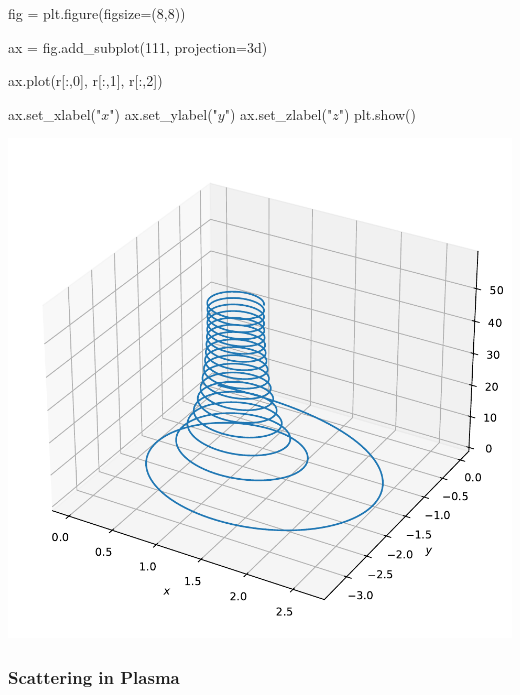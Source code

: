 \documentclass[
  letterpaper,
  DIV=11,
  numbers=noendperiod]{scrreprt}
\newenvironment{Shaded}{\begin{snugshade}}{\end{snugshade}}
\newcommand{\DecValTok}[1]{\textcolor[rgb]{0.68,0.00,0.00}{#1}}
\newcommand{\NormalTok}[1]{\textcolor[rgb]{0.00,0.23,0.31}{#1}}
\newcommand{\OperatorTok}[1]{\textcolor[rgb]{0.37,0.37,0.37}{#1}}
\newcommand{\StringTok}[1]{\textcolor[rgb]{0.13,0.47,0.30}{#1}}
\begin{document}
\begin{tcolorbox}[enhanced jigsaw, toprule=.15mm, colframe=quarto-callout-color-frame, bottomrule=.15mm, leftrule=.75mm, left=2mm, breakable, rightrule=.15mm, arc=.35mm, opacityback=0, colback=white]
\begin{Shaded}
\begin{Highlighting}[]
\NormalTok{fig }\OperatorTok{=}\NormalTok{ plt.figure(figsize}\OperatorTok{=}\NormalTok{(}\DecValTok{8}\NormalTok{,}\DecValTok{8}\NormalTok{))}

\NormalTok{ax }\OperatorTok{=}\NormalTok{ fig.add\_subplot(}\DecValTok{111}\NormalTok{, projection}\OperatorTok{=}\StringTok{\textquotesingle{}3d\textquotesingle{}}\NormalTok{)}

\NormalTok{ax.plot(r[:,}\DecValTok{0}\NormalTok{], r[:,}\DecValTok{1}\NormalTok{], r[:,}\DecValTok{2}\NormalTok{])}

\NormalTok{ax.set\_xlabel(}\StringTok{"$x$"}\NormalTok{)}
\NormalTok{ax.set\_ylabel(}\StringTok{"$y$"}\NormalTok{)}
\NormalTok{ax.set\_zlabel(}\StringTok{"$z$"}\NormalTok{)}
\NormalTok{plt.show()}
\end{Highlighting}
\end{Shaded}

\includegraphics{chap2_files/figure-pdf/cell-9-output-1.pdf}

\end{tcolorbox}

\subsubsection{Scattering in Plasma}\label{scattering-in-plasma}
\end{document}
